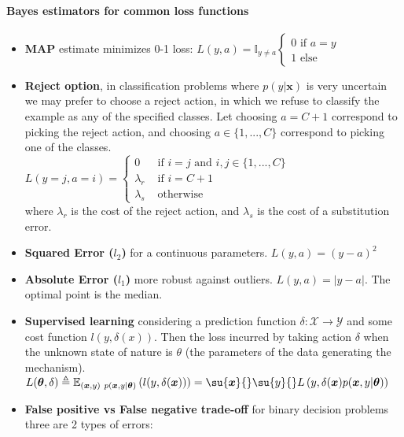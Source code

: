 \paragraph{Bayes estimators for common loss functions}
\begin{itemize}
    \item \textbf{MAP} estimate minimizes 0-1 loss: $L(y, a) = \mathbb{I}_{y\neq a}
		\begin{cases}
			0 \text{ if } a = y\\
			1 \text{ else}
		\end{cases}$
    \item \textbf{Reject option}, in classification problems where $p(y|\bm{x})$ is very 
		uncertain we may prefer to choose a reject action, in which we refuse to 
		classify the example as any of the specified classes. Let choosing $a=C+1$
		correspond to picking the reject action, and choosing $a\in\{1,...,C\}$
		correspond to picking one of the classes.\\
		$L(y=j, a=i) = 
		\begin{cases}
			0 &\text{ if } i=j \text{ and } i,j\in\{1,...,C\}\\
			\lambda_{r} &\text{ if } i=C+1 \\
			\lambda_{s} &\text{ otherwise}
		\end{cases} $\\
		where $\lambda_{r}$ is the cost of the reject action, and $\lambda_{s}$ is
		the cost of a substitution error. 
    \item \textbf{Squared Error ($l_{2}$)} for a continuous parameters. $L(y, a) =
        (y-a)^{2}$
    \item \textbf{Absolute Error ($l_{1}$)} more robust against outliers. $L(y,a)=
		\lvert y-a\rvert$. The optimal point is the median.
    \item \textbf{Supervised learning} considering a prediction function $\delta: 
        \mathcal{X} \rightarrow \mathcal{Y}$ and some cost function $l(y, \delta(x))$. 
        Then the loss incurred by taking action $\delta$ when the unknown state of nature
        is $\theta$ (the parameters of the data generating the mechanism).
        $L(\bm{\theta}, \delta) \triangleq 
        \mathbb{E}_{(\bm{x}, y)~p(\bm{x},y|\bm{\theta})}\left(
        l(y, \delta(\bm{x}))\right)=\su{\bm{x}}{}\su{y}{}L\left(y,\delta(\bm{x}) 
        p(\bm{x},y|\bm{\theta})\right)$
    \item \textbf{False positive vs False negative trade-off} for binary decision problems
        three are 2 types of errors:

\end{itemize}
